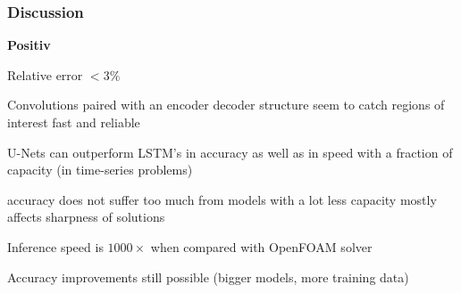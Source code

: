 \begin{frame}
    \frametitle{Discussion}
	\vspace*{0.8cm}
    \textbf{Positiv}

\begin{PraesentationAufzaehlung}
	\item Relative error $< 3\%$
	
	\item Convolutions paired with an encoder decoder structure seem to \newline catch regions of interest fast and reliable

    \item U-Nets can outperform LSTM’s in accuracy as well as in speed \newline with a fraction of capacity (in time-series problems)
    
    \item accuracy does not suffer too much from models with a lot less capacity \newline mostly affects sharpness of solutions

    \item Inference speed is $1000\times$ when compared with OpenFOAM solver
    
    \item Accuracy improvements still possible (bigger models, more training data)
\end{PraesentationAufzaehlung}

\end{frame}
\clearpage

